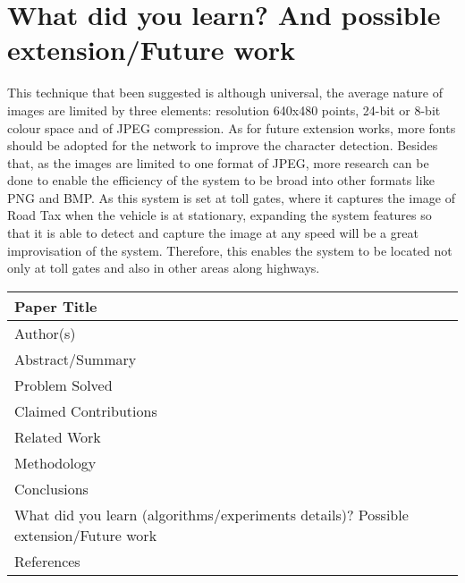 \documentclass[12pt]{article}
\begin{document}
\section{What did you learn? And possible extension/Future work}
This technique that been suggested is although universal, the average nature of images are limited by three elements: resolution 640x480 points, 24-bit or 8-bit colour space and of JPEG compression. As for future extension works, more fonts should be adopted for the network to improve the character detection. Besides that, as the images are limited to one format of JPEG, more research can be done to enable the efficiency of the system to be broad into other formats like PNG and BMP. 
As this system is set at toll gates, where it captures the image of Road Tax when the vehicle is at stationary, expanding the system features so that it is able to detect and capture the image at any speed will be a great improvisation of the system. Therefore, this enables the system to be located not only at toll gates and also in other areas along highways.   

\pagebreak



\begin{tabular}{|m{6cm} |m{10cm}|}
\hline 
Paper Title & \\ 
\hline 
Author(s) & \\ 
\hline 
Abstract/Summary & \\ 
\hline 
Problem Solved & \\ 
\hline 
Claimed Contributions & \\ 
\hline 
Related Work & \\ 
\hline 
Methodology & \\ 
\hline 
Conclusions & \\ 
\hline 
What did you learn 
\newline (algorithms/experiments
details)?
\newline
\newline 
Possible extension/Future
work & \\ 
\hline 
References & \\ 
\hline 
\end{tabular} 
\end{document}
